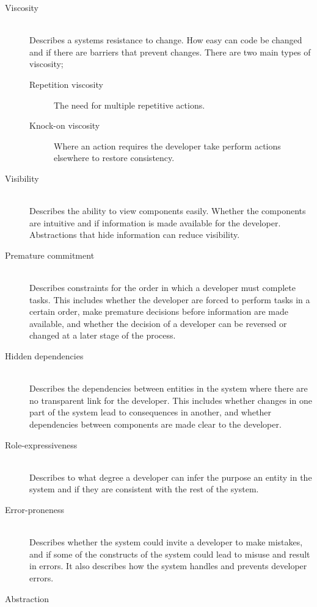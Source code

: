 \begin{description}
    \item[Viscosity]\hfill\\
    Describes a systems resistance to change. How easy can code be changed and if there are barriers that prevent changes. There are two main types of viscosity;
    \begin{description}
        \item[Repetition viscosity] The need for multiple repetitive actions.
        \item[Knock-on viscosity] Where an action requires the developer take perform actions elsewhere to restore consistency. 
    \end{description}
    \item[Visibility]\hfill\\
    Describes the ability to view components easily. Whether the components are intuitive and if information is made available for the developer. Abstractions that hide information can reduce visibility.
    \item[Premature commitment]\hfill\\
    Describes constraints for the order in which a developer must complete tasks. This includes whether the developer are forced to perform tasks in a certain order, make premature decisions before information are made available, and whether the decision of a developer can be reversed or changed at a later stage of the process.
    \item[Hidden dependencies]\hfill\\ %
    Describes the dependencies between entities in the system where there are no transparent link for the developer. This includes whether changes in one part of the system lead to consequences in another, and whether dependencies between components are made clear to the developer.
    \item[Role-expressiveness]\hfill\\
    Describes to what degree a developer can infer the purpose an entity in the system and if they are consistent with the rest of the system. 
    \item[Error-proneness]\hfill\\
    Describes whether the system could invite a developer to make mistakes, and if some of the constructs of the system could lead to misuse and result in errors. It also describes how the system handles and prevents developer errors.
    \item[Abstraction]\hfill\\

\end{description}

